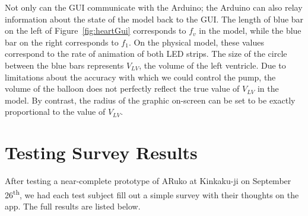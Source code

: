 \documentclass[a4paper, 10pt, american, titlepage]{article}
\begin{document}
Not only can the GUI communicate with the Arduino; the Arduino can also relay
information about the state of the model back to the GUI. The length of blue bar
on the left of Figure~\ref{fig:heartGui} corresponds to $f_{v}$ in the model,
while the blue bar on the right corresponds to $f_{1}$. On the physical model,
these values correspond to the rate of animation of both LED strips. The size of
the circle between the blue bars represents $V_{LV}$, the volume of the left
ventricle. Due to limitations about the accuracy with which we could control the
pump, the volume of the balloon does not perfectly reflect the true value of
$V_{LV}$ in the model. By contrast, the radius of the graphic on-screen can be
set to be exactly proportional to the value of $V_{LV}$.


\clearpage

\section{Testing Survey Results}
\label{sec:testingSurveyResults}

After testing a near-complete prototype of ARuko at Kinkaku-ji on September
26\textsuperscript{th}, we had each test subject fill out a simple survey with
their thoughts on the app. The full results are listed below.
\end{document}
